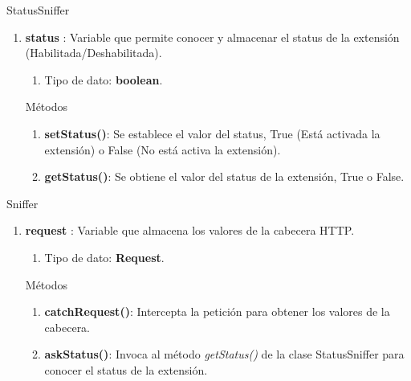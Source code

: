 \documentclass[12pt, a4paper, titlepage]{report}
\begin{document}
			    \large StatusSniffer
			    \begin{enumerate}
    		        \item \textbf{status} : Variable que permite conocer y almacenar el status de la extensión (Habilitada/Deshabilitada).
    		        \begin{enumerate}
    		            \item Tipo de dato: \textbf{boolean}.
    		        \end{enumerate}
    		        Métodos
    		        \begin{enumerate}
    		            \item \textbf{setStatus()}: Se establece el valor del status, True (Está activada la extensión) o False (No está activa la extensión).
    		            \item \textbf{getStatus()}: Se obtiene el valor del status de la extensión, True o False.
    		        \end{enumerate}
			    \end{enumerate}
		        
	            \large Sniffer
			    \begin{enumerate}
    		        \item \textbf{request} : Variable que almacena los valores de la cabecera HTTP.
    		        \begin{enumerate}
    		            \item Tipo de dato: \textbf{Request}.
    		        \end{enumerate}
    		        Métodos
    		        \begin{enumerate}
    		            \item \textbf{catchRequest()}: Intercepta la petición para obtener los valores de la cabecera.
    		            \item \textbf{askStatus()}: Invoca al método \textit{getStatus()} de la clase StatusSniffer para conocer el status de la extensión.
    		        \end{enumerate}
			    \end{enumerate}
			    
\end{document}
